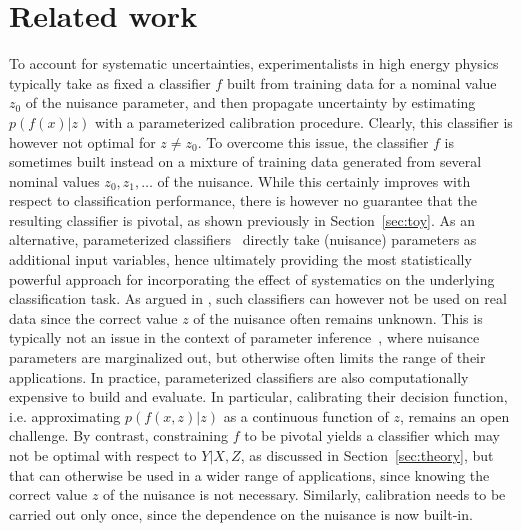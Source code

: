 \documentclass[twocolumn,superscriptaddress,aps]{revtex4-1}
\theoremstyle{plain}
\begin{document}

\section{Related work}

To account for systematic uncertainties, experimentalists in high energy physics
typically take as fixed a classifier $f$ built from training data for a nominal
value $z_0$ of the nuisance parameter, and then propagate uncertainty
 by estimating $p(f(x)|z)$ with a parameterized calibration
procedure. Clearly, this classifier is however not optimal for $z \neq z_0$.
To overcome this issue, the classifier $f$ is sometimes built instead on a mixture
of training data generated from several nominal values $z_0, z_1, \dots$ of the nuisance.
While this certainly improves with respect to classification performance,
there is however no guarantee that the resulting classifier is pivotal, as shown
previously in Section~\ref{sec:toy}.
As an alternative, parameterized
classifiers~\citep{cranmer2015approximating,Baldi:2016fzo} directly take
(nuisance) parameters as additional input variables, hence ultimately providing
the most statistically powerful approach for incorporating the effect of
systematics on the underlying classification task.  As argued in
\citep{Neal:2007zz}, such classifiers can however not be used on real data since
the correct value $z$ of the nuisance often remains unknown. This is typically
not an issue in the context of parameter
inference~\citep{cranmer2015approximating}, where nuisance parameters are
marginalized out, but otherwise often limits the range of their applications. In
practice, parameterized classifiers  are also computationally expensive to build
and evaluate. In particular, calibrating their decision function, i.e.
approximating $p(f(x,z)|z)$ as a continuous function of $z$, remains an open
challenge. By contrast, constraining $f$ to be pivotal yields a classifier which
may not be optimal with respect to $Y|X,Z$, as discussed in
Section~\ref{sec:theory}, but that can otherwise be used in a wider range of
applications, since knowing the correct value $z$ of the nuisance is not
necessary. Similarly, calibration needs to be carried out only once, since  the
dependence on the nuisance is now built-in.
\end{document}
